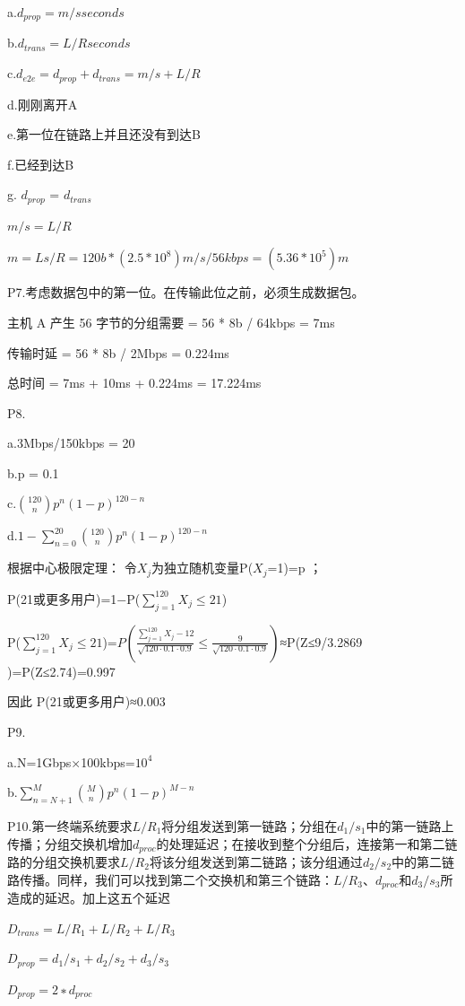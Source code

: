 \documentclass[11pt,UTF8,twoside]{article}
\begin{document}
	a.$d_{prop}=m/s seconds$
	
	b.$d_{trans}=L/R seconds$
	
	c.$d_{e2e}=d_{prop}+d_{trans}=m/s+L/R$
	
	d.刚刚离开A
	
	e.第一位在链路上并且还没有到达B
	
	f.已经到达B
	
	g.
	$d_{prop}$ = $d_{trans}$
	
	$m/s = L/R$
	
	$m = Ls/R = 120b * (2.5 *10^8)m/s / 56kbps = (5.36 * 10^5)m$
	
	P7.考虑数据包中的第一位。在传输此位之前，必须生成数据包。
	
	主机 A 产生 56 字节的分组需要 = 56 * 8b / 64kbps = 7ms
	
	传输时延 = 56 * 8b / 2Mbps = 0.224ms
	
	总时间 = 7ms + 10ms + 0.224ms = 17.224ms
	
	P8.
	
	a.3Mbps/150kbps = 20
	
	b.p = 0.1
	
	c.$\binom{120}{n}p^n(1-p)^{120-n}$
	
	d.$1-\sum_{n=0}^{20}\binom{120}{n}p^n(1-p)^{120-n}$
	
	根据中心极限定理：
	令$X_j$为独立随机变量P($X_j$​=1)=p ；
	
	P(21或更多用户)=1−P($\sum_{j=1}^{120}X_j≤21$)
	
	P($\sum_{j=1}^{120}X_j≤21$)=$P\left ( \frac{\sum_{j=1}^{120}X_j-12}{\sqrt{120\cdot 0.1\cdot0.9}}\leq \frac{9}{\sqrt{120\cdot 0.1\cdot0.9}} \right )$≈P(Z≤9/3.2869​)=P(Z≤2.74)=0.997
	
	因此 P(21或更多用户)≈0.003
	
	P9.
	
	a.N=1Gbps×100kbps=$10^4$
	
	b.$\sum_{n=N+1}^{M}\binom{M}{n}p^n(1-p)^{M-n}$
	
	P10.第一终端系统要求$L/R_1$将分组发送到第一链路；分组在$d_1/s_1$中的第一链路上传播；分组交换机增加$d_{proc}$的处理延迟；在接收到整个分组后，连接第一和第二链路的分组交换机要求$L/R_2$将该分组发送到第二链路；该分组通过$d_2/s_2$中的第二链路传播。同样，我们可以找到第二个交换机和第三个链路：$L/R_3$、$d_{proc}$和$d_3/s_3$所造成的延迟。加上这五个延迟
	
	$D_{trans}=L/R_1+L/R_2+L/R_3$
	
	$D_{prop}=d_1/s_1+d_2/s_2+d_3/s_3$
	
	$D_{prop}=2∗d_{proc}$
	
\end{document}
